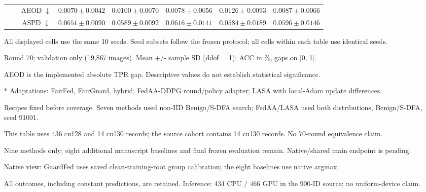 \begin{table}[t]
{\begin{tabular}{l|l|c|ccccc}
 &  & AEOD $\downarrow$ & $0.0070 \pm 0.0042$ & $0.0100 \pm 0.0070$ & $0.0078 \pm 0.0056$ & $0.0126 \pm 0.0093$ & $0.0087 \pm 0.0066$ \\
 &  & ASPD $\downarrow$ & $0.0651 \pm 0.0090$ & $0.0589 \pm 0.0092$ & $0.0616 \pm 0.0141$ & $0.0584 \pm 0.0189$ & $0.0596 \pm 0.0146$ \\
\hline\hline
\end{tabular}}
\par\smallskip
\begin{minipage}{\textwidth}\scriptsize
All displayed cells use the same 10 seeds. Seed subsets follow the frozen protocol; all cells within each table use identical seeds.\par
Round 70; validation only (19,867 images). Mean +/- sample SD (ddof = 1); ACC in \%, gaps on [0, 1].\par
AEOD is the implemented absolute TPR gap. Descriptive values do not establish statistical significance.\par
* Adaptations: FairFed, FairGuard, hybrid; FedAA-DDPG round/policy adapter; LASA with local-Adam update differences.\par
Recipes fixed before coverage. Seven methods used non-IID Benign/S-DFA search; FedAA/LASA used both distributions, Benign/S-DFA, seed 91001.\par
This table uses 436 cu128 and 14 cu130 records; the source cohort contains 14 cu130 records. No 70-round equivalence claim.\par
Nine methods only; eight additional manuscript baselines and final frozen evaluation remain. Native/shared main endpoint is pending.\par
Native view: GuardFed uses saved clean-training-root group calibration; the eight baselines use native argmax.\par
All outcomes, including constant predictions, are retained. Inference: 434 CPU / 466 GPU in the 900-ID source; no uniform-device claim.\par
\end{minipage}
\end{table}
